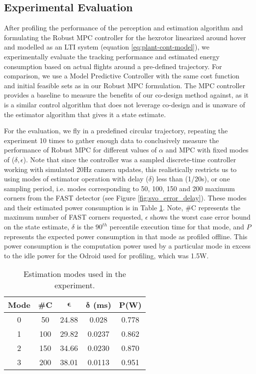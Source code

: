 \subsection{Experimental Evaluation}

After profiling the performance of the perception and estimation algorithm and formulating the Robust MPC controller for the hexrotor linearized around hover and modelled as an LTI system (equation \ref{eq:plant-cont-model}), we experimentally evaluate the tracking performance and estimated energy consumption based on actual flights around a pre-defined trajectory. For comparison, we use a Model Predictive Controller with the same cost function and initial feasible sets as in our Robust MPC formulation. The MPC controller provides a baseline to measure the benefits of our co-design method against, as it is a similar control algorithm that does not leverage co-design and is unaware of the estimator algorithm that gives it a state estimate. 

For the evaluation, we fly in a predefined circular trajectory, repeating the experiment 10 times to gather enough data to conclusively measure the performance of Robust MPC for different values of $\alpha$ and MPC with fixed modes of ($\delta,\epsilon$). Note that since the controller was a sampled discrete-time controller working with simulated 20Hz camera updates, this realistically restricts us to using modes of estimator operation with delay ($\delta$) less than (1/20s), or one sampling period, i.e. modes corresponding to 50, 100, 150 and 200 maximum corners from the  FAST detector (see Figure \ref{fig:svo_error_delay}). These modes and their estimated power consumption is in Table \ref{tbl:modes_exp}. Note, \#C represents the maximum number of FAST corners requested, $\epsilon$ shows the worst case error bound on the state estimate, $\delta$ is the $90^{th}$ percentile execution time for that mode, and $P$ represents the expected power consumption in that mode as profiled offline. This power consumption is the computation power used by a particular mode in excess to the idle power for the Odroid used for profiling, which was 1.5W.

\begin{table}[htb]
\begin{center}
\caption{Estimation modes used in the experiment.}
\label{tbl:modes_exp}
\begin{tabular} {|c|c|c|c|c|}
	\hline
	\textbf{Mode} & \textbf{\#C} & $\pmb{\epsilon}$ & $\pmb{\delta}$ \textbf{(ms)} & $\pmb{P}$\textbf{(W)} \\ \hline
	0 & 50 &  24.88 & 0.028 &  0.778  \\ \hline
 	1 & 100 & 29.82 & 0.0237 &  0.862  \\ \hline
	2 & 150 & 34.66 & 0.0230 & 0.870 \\ \hline
	3 & 200 & 38.01 & 0.0113 & 0.951 \\ \hline
	\end{tabular}	
	\end{center}
\end{table}


